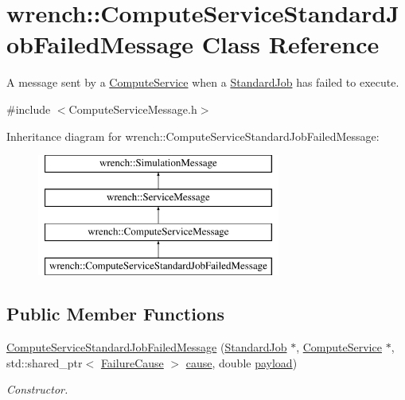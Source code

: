\hypertarget{classwrench_1_1_compute_service_standard_job_failed_message}{}\section{wrench\+:\+:Compute\+Service\+Standard\+Job\+Failed\+Message Class Reference}
\label{classwrench_1_1_compute_service_standard_job_failed_message}


A message sent by a \hyperlink{classwrench_1_1_compute_service}{Compute\+Service} when a \hyperlink{classwrench_1_1_standard_job}{Standard\+Job} has failed to execute.  




{\ttfamily \#include $<$Compute\+Service\+Message.\+h$>$}

Inheritance diagram for wrench\+:\+:Compute\+Service\+Standard\+Job\+Failed\+Message\+:\begin{figure}[H]
\begin{center}
\leavevmode
\includegraphics[height=4.000000cm]{classwrench_1_1_compute_service_standard_job_failed_message}
\end{center}
\end{figure}
\subsection*{Public Member Functions}
\begin{DoxyCompactItemize}
\item 
\hyperlink{classwrench_1_1_compute_service_standard_job_failed_message_ab4b54a70c603d2fea31163415cdc35c2}{Compute\+Service\+Standard\+Job\+Failed\+Message} (\hyperlink{classwrench_1_1_standard_job}{Standard\+Job} $\ast$, \hyperlink{classwrench_1_1_compute_service}{Compute\+Service} $\ast$, std\+::shared\+\_\+ptr$<$ \hyperlink{classwrench_1_1_failure_cause}{Failure\+Cause} $>$ \hyperlink{classwrench_1_1_compute_service_standard_job_failed_message_a84e1ec62e44d09f11f74ee4421517836}{cause}, double \hyperlink{classwrench_1_1_simulation_message_a914f2732713f7c02898e66f05a7cb8a1}{payload})
\begin{DoxyCompactList}\small\item\em Constructor. \end{DoxyCompactList}\end{DoxyCompactItemize}

